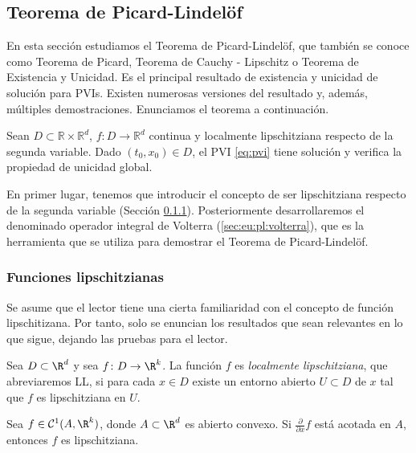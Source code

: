 \documentclass{article}
\begin{document}
\subsection{Teorema de Picard-Lindelöf} \label{sec:eu:pl}

En esta sección estudiamos el Teorema de Picard-Lindelöf, que también se conoce como Teorema de
Picard, Teorema de Cauchy - Lipschitz o Teorema de Existencia y Unicidad. Es el principal resultado
de existencia y unicidad de solución para PVIs. Existen numerosas versiones del resultado y, además,
múltiples demostraciones. Enunciamos el teorema a continuación.

\begin{thm}
  Sean $D \subset \mathbb{R} \times \mathbb{R}^d$, $f\colon D \to \mathbb{R}^d$ continua y localmente
  lipschitziana respecto de la segunda variable. Dado $(t_0, x_0) \in D$, el PVI \eqref{eq:pvi}
  tiene solución y verifica la propiedad de unicidad global.
\end{thm}

En primer lugar, tenemos que introducir el concepto de ser lipschitziana respecto de la segunda
variable (Sección \ref{sec:eu:pl:lips}). Posteriormente desarrollaremos el denominado operador
integral de Volterra (\ref{sec:eu:pl:volterra}), que es la herramienta que se utiliza para demostrar
el Teorema de Picard-Lindelöf.

\subsubsection{Funciones lipschitzianas} \label{sec:eu:pl:lips}

Se asume que el lector tiene una cierta familiaridad con el concepto de función lipschitizana. Por
tanto, solo se enuncian los resultados que sean relevantes en lo que sigue, dejando las pruebas para
el lector.

\begin{definition}
  Sea $D \subset \R^d$ y sea $f \colon D \to \R^k$. La función $f$ es \emph{localmente
    lipschitziana}, que abreviaremos LL, si para cada $x \in D$ existe un entorno abierto
  $U \subset D$ de $x$ tal que $f$ es lipschitziana en $U$.
\end{definition}

\begin{proposition}
  Sea $f \in \mathcal{C}^1(A, \R^k)$, donde $A \subset \R^d$ es abierto convexo. Si
  $\frac{\partial}{\partial x}f$ está acotada en $A$, entonces $f$ es lipschitziana.
\end{proposition}
\end{document}
